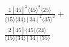 \documentclass[varwidth, border=5pt]{standalone}
\begin{document}
\begin{my}
$\begin{gathered}
\scriptscriptstyle\frac{1[45]^2⟨45⟩^2⟨25⟩}{⟨15⟩⟨34⟩[34]^2⟨35⟩^2}+\\
\scriptscriptstyle\frac{2[45]⟨45⟩⟨24⟩}{⟨15⟩⟨34⟩[34]⟨35⟩}\phantom{+}
\end{gathered}$
\end{my}
\end{document}
